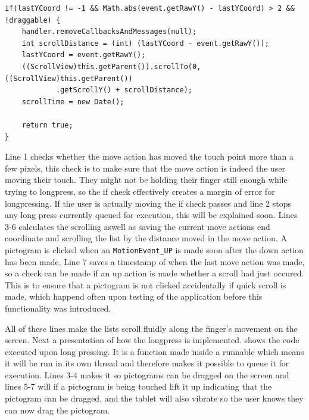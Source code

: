\begin{lstlisting}[float, floatplacement=h, number=left, caption={The code executed when someone performs a move action.}, label={lst:actionmove}] 
if(lastYCoord != -1 && Math.abs(event.getRawY() - lastYCoord) > 2 && !draggable) {
    handler.removeCallbacksAndMessages(null);
    int scrollDistance = (int) (lastYCoord - event.getRawY());
    lastYCoord = event.getRawY();
    ((ScrollView)this.getParent()).scrollTo(0,((ScrollView)this.getParent())
    		.getScrollY() + scrollDistance);
	scrollTime = new Date();

	return true;
}
\end{lstlisting}

Line 1 checks whether the move action has moved the touch point more than a few pixels, this check is to make sure that the move action is indeed the user moving their touch.
They might not be holding their finger still enough while trying to longpress, so the if check effectively creates a margin of error for longpressing.
If the user is actually moving the if check passes and line 2 stops any long press currently queued for execution, this will be explained soon.
Lines 3-6 calculates the scrolling aswell as saving the current move actions end coordinate and scrolling the list by the distance moved in the move action.
A pictogram is clicked when an \texttt{MotionEvent\_UP} is made soon after the down action has been made.
Line 7 saves a timestamp of when the last move action was made, so a check can be made if an up action is made whether a scroll had just occured. 
This is to ensure that a pictogram is not clicked accidentally if quick scroll is made, which happend often upon testing of the application before this functionality was introduced.

All of these lines make the lists scroll fluidly along the finger's movement on the screen.
Next a presentation of how the longpress is implemented.
 shows the code executed upon long pressing.
It is a function made inside a runnable which means it will be run in its own thread and therefore makes it possible to queue it for execution.
Lines 3-4 makes it so pictograms can be dragged on the screen and lines 5-7 will if a pictogram is being touched lift it up indicating that the pictogram can be dragged, and the tablet will also vibrate so the user knows they can now drag the pictogram.

